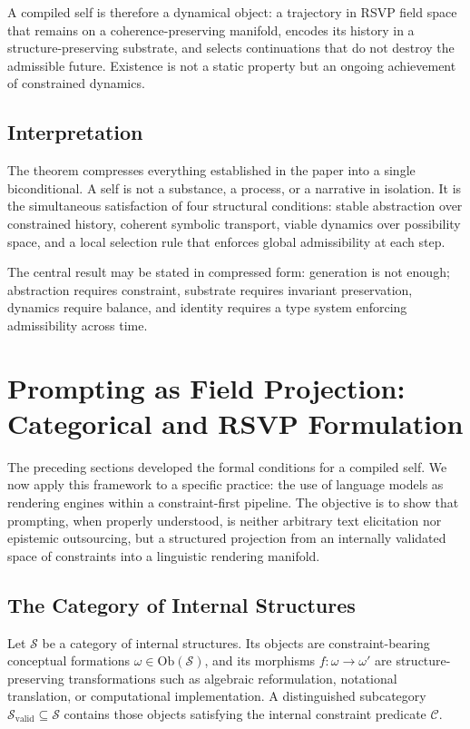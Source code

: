 \documentclass[12pt, a4paper]{article}
\theoremstyle{plain}
\theoremstyle{definition}
\theoremstyle{remark}
\begin{document}
A compiled self is therefore a dynamical object: a trajectory in RSVP field space that remains on a coherence-preserving manifold, encodes its history in a structure-preserving substrate, and selects continuations that do not destroy the admissible future. Existence is not a static property but an ongoing achievement of constrained dynamics.

\subsection{Interpretation}

The theorem compresses everything established in the paper into a single biconditional. A self is not a substance, a process, or a narrative in isolation. It is the simultaneous satisfaction of four structural conditions: stable abstraction over constrained history, coherent symbolic transport, viable dynamics over possibility space, and a local selection rule that enforces global admissibility at each step.

The central result may be stated in compressed form: generation is not enough; abstraction requires constraint, substrate requires invariant preservation, dynamics require balance, and identity requires a type system enforcing admissibility across time.

\section{Prompting as Field Projection: Categorical and RSVP Formulation}

The preceding sections developed the formal conditions for a compiled self. We now apply this framework to a specific practice: the use of language models as rendering engines within a constraint-first pipeline. The objective is to show that prompting, when properly understood, is neither arbitrary text elicitation nor epistemic outsourcing, but a structured projection from an internally validated space of constraints into a linguistic rendering manifold.

\subsection{The Category of Internal Structures}

Let $\mathcal{S}$ be a category of internal structures. Its objects are constraint-bearing conceptual formations $\omega \in \mathrm{Ob}(\mathcal{S})$, and its morphisms $f : \omega \to \omega'$ are structure-preserving transformations such as algebraic reformulation, notational translation, or computational implementation. A distinguished subcategory $\mathcal{S}_{\mathrm{valid}} \subseteq \mathcal{S}$ contains those objects satisfying the internal constraint predicate $\mathcal{C}$.
\end{document}
